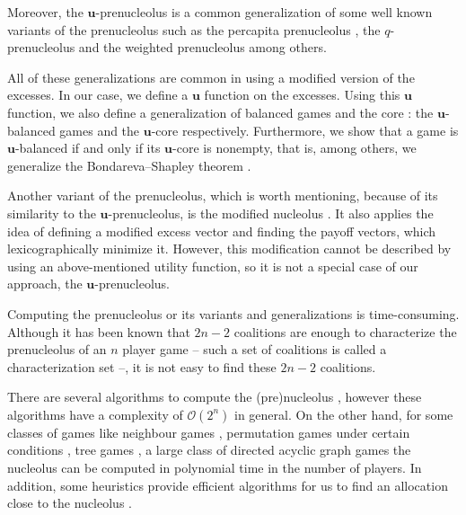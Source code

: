 \documentclass[a4paper,12pt]{article}
\theoremstyle{definition}
\theoremstyle{remark}
\begin{document}

Moreover, the $\mathbf{u}$-prenucleolus is a common generalization of some well known variants of the prenucleolus such as the percapita prenucleolus \citep{Grotte1970,Grotte1972}, the $q$-prenucleolus \citep{Solymosi2019} and the weighted prenucleolus \citep{DerksHaller1999} among others. 

All of these generalizations are common in using a modified version of the excesses. In our case, we define a $\mathbf{u}$ function on the excesses. Using this $\mathbf{u}$ function, we also define a generalization of balanced games and the core \citep{Shapley1955,Gillies1959}: the $\mathbf{u}$-balanced games and the $\mathbf{u}$-core respectively. Furthermore, we show that a game is $\mathbf{u}$-balanced if and only if its $\mathbf{u}$-core is nonempty, that is, among others, we generalize the Bondareva--Shapley theorem \citep{Bondareva1963,Shapley1967,Faigle1989}. 

Another variant of the prenucleolus, which is worth mentioning, because of its similarity to the $\mathbf{u}$-prenucleolus, is the modified nucleolus \citep{Sudholter1996,Sudholter1997}. It also applies the idea of defining a modified excess vector and finding the payoff vectors, which lexicographically minimize it. However, this modification cannot be described by using an above-mentioned utility function, so it is not a special case of our approach, the $\mathbf{u}$-prenucleolus.

Computing the prenucleolus or its variants and generalizations is time-consuming. Although it has been known that $2n -2$ coalitions are enough to characterize the prenucleolus of an $n$ player game  \citep{Brune1983,ReijniersePotters1998} -- such a set of coalitions is called a characterization set --, it is not easy to find these $2n-2$ coalitions.

There are several algorithms to compute the (pre)nucleolus \citep{Kohlberg1972, Solymosi1993, PereaPuerto2013}, however these algorithms have a complexity of $\mathcal{O} (2^n)$ in general. On the other hand, for some classes of games like neighbour games \citep{Hamers2003}, permutation games under certain conditions \citep{Solymosi2005}, tree games \citep{Maschler2010}, a large class of directed acyclic graph games \citep{Sziklai2017} the nucleolus can be computed in polynomial time in the number of players. In addition, some heuristics provide efficient algorithms for us to find an allocation close to the nucleolus \citep{PereaPuerto2019}. 
\end{document}
